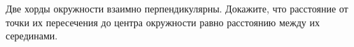 \begin{ex}
	\begin{condition}
		Две хорды окружности взаимно перпендикулярны. Докажите, что расстояние от точки их пересечения до центра окружности равно расстоянию между их серединами.
	\end{condition}
\end{ex}
